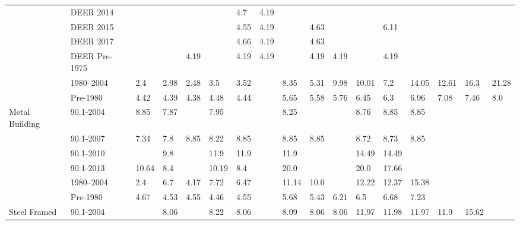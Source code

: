 \begin{table}
\begin{tabular}{p{0.3in}p{0.5in}p{0.15in}p{0.15in}p{0.15in}p{0.15in}p{0.15in}p{0.15in}p{0.15in}p{0.15in}p{0.15in}p{0.15in}p{0.15in}p{0.15in}p{0.15in}p{0.15in}p{0.15in}}
           & DEER 2014 &        &        &        &        &    4.7 &   4.19 &        &        &        &        &        &        &        &        &        \\
           & DEER 2015 &        &        &        &        &   4.55 &   4.19 &        &   4.63 &        &        &   6.11 &        &        &        &        \\
           & DEER 2017 &        &        &        &        &   4.66 &   4.19 &        &   4.63 &        &        &        &        &        &        &        \\
           & DEER Pre-1975 &        &        &   4.19 &        &   4.19 &   4.19 &        &   4.19 &   4.19 &        &   4.19 &        &        &        &        \\
           & 1980--2004 &    2.4 &   2.98 &   2.48 &    3.5 &   3.52 &        &   8.35 &   5.31 &   9.98 &  10.01 &    7.2 &  14.05 &  12.61 &   16.3 &  21.28 \\
           & Pre-1980 &   4.42 &   4.39 &   4.38 &   4.48 &   4.44 &        &   5.65 &   5.58 &   5.76 &   6.45 &    6.3 &   6.96 &   7.08 &   7.46 &    8.0 \\ \hline
Metal Building & 90.1-2004 &   8.85 &   7.87 &        &   7.95 &        &        &   8.25 &        &        &   8.76 &   8.85 &   8.85 &        &        &        \\
           & 90.1-2007 &   7.34 &    7.8 &   8.85 &   8.22 &   8.85 &        &   8.85 &   8.85 &        &   8.72 &   8.73 &   8.85 &        &        &        \\
           & 90.1-2010 &        &    9.8 &        &   11.9 &   11.9 &        &   11.9 &        &        &  14.49 &  14.49 &        &        &        &        \\
           & 90.1-2013 &  10.64 &    8.4 &        &  10.19 &    8.4 &        &   20.0 &        &        &   20.0 &  17.66 &        &        &        &        \\
           & 1980--2004 &    2.4 &    6.7 &   4.17 &   7.72 &   6.47 &        &  11.14 &   10.0 &        &  12.22 &  12.37 &  15.38 &        &        &        \\
           & Pre-1980 &   4.67 &   4.53 &   4.55 &   4.46 &   4.55 &        &   5.68 &   5.43 &   6.21 &    6.5 &   6.68 &   7.23 &        &        &        \\ \hline
Steel Framed & 90.1-2004 &        &   8.06 &        &   8.22 &   8.06 &        &   8.09 &   8.06 &   8.06 &  11.97 &  11.98 &  11.97 &   11.9 &  15.62 &        \\

\end{tabular}
\end{table}
